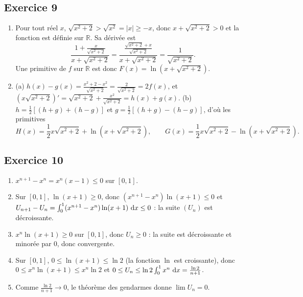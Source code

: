 \begin{corrige}
\subsection*{Exercice 9}
\begin{enumerate}
\item Pour tout r\'eel $x$, $\sqrt{x^2+2} > \sqrt{x^2} = |x| \geq -x$, donc $x + \sqrt{x^2+2} > 0$ et la fonction est d\'efinie sur $\mathbb{R}$.
      Sa d\'eriv\'ee est
      \[
      \frac{1 + \frac{x}{\sqrt{x^2+2}}}{x + \sqrt{x^2+2}} = \frac{\frac{\sqrt{x^2+2} + x}{\sqrt{x^2+2}}}{x+\sqrt{x^2+2}} = \frac{1}{\sqrt{x^2+2}} .
      \]
      Une primitive de $f$ sur $\mathbb{R}$ est donc $F(x) = \ln\left(x + \sqrt{x^2+2}\right)$.
\item (a) $h(x) - g(x) = \frac{x^2 + 2 - x^2}{\sqrt{x^2+2}} = \frac{2}{\sqrt{x^2+2}} = 2f(x)$, et
      $\left(x\sqrt{x^2+2}\right)' = \sqrt{x^2+2} + \frac{x^2}{\sqrt{x^2+2}} = h(x) + g(x)$.
      (b) $h = \frac{1}{2}\left[(h+g) + (h-g)\right]$ et $g = \frac{1}{2}\left[(h+g) - (h-g)\right]$, d'o\`u les primitives
      \[
      H(x) = \frac{1}{2}x\sqrt{x^2+2} + \ln\left(x+\sqrt{x^2+2}\right), \qquad
      G(x) = \frac{1}{2}x\sqrt{x^2+2} - \ln\left(x+\sqrt{x^2+2}\right).
      \]
\end{enumerate}

\subsection*{Exercice 10}
\begin{enumerate}
\item $x^{n+1} - x^n = x^n(x-1)\leq 0$ sur $[0,1]$.
\item Sur $[0,1]$, $\ln(x+1)\geq 0$, donc $(x^{n+1} - x^n)\ln(x+1)\leq 0$ et $U_{n+1} - U_n = \int_0^1 (x^{n+1}-x^n)\ln(x+1)~\mathrm{d}x\leq 0$ :
      la suite $(U_n)$ est d\'ecroissante.
\item $x^n\ln(x+1)\geq 0$ sur $[0,1]$, donc $U_n\geq 0$ : la suite est d\'ecroissante et minor\'ee par $0$, donc convergente.
\item Sur $[0,1]$, $0\leq\ln(x+1)\leq\ln 2$ (la fonction $\ln$ est croissante), donc $0\leq x^n\ln(x+1)\leq x^n\ln 2$ et
      $0\leq U_n\leq\ln 2\int_0^1 x^n~\mathrm{d}x = \frac{\ln 2}{n+1}$.
\item Comme $\frac{\ln 2}{n+1}\to 0$, le th\'eor\`eme des gendarmes donne $\lim U_n = \boxed{0}$.
\end{enumerate}
\end{corrige}
